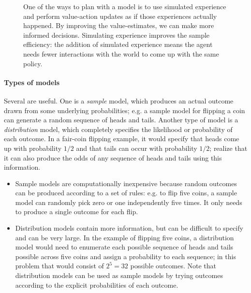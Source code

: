 \documentclass[12pt]{article}
\begin{document}
\begin{figure}[h]
  \centering
  \caption{\footnotesize One of the ways to plan with a model is to use simulated experience and perform value-action updates as if those experiences actually happened. By improving the value-estimates, we can make more informed decisions. Simulating experience improves the sample efficiency: the addition of simulated experience means the agent needs fewer interactions with the world to come up with the same policy.}
\end{figure}

\paragraph{Types of models} Several are useful. One is a \emph{sample} model, which produces an actual outcome drawn from some underlying probabilities; e.g. a sample model for flipping a coin can generate a random sequence of heads and tails. Another type of model is a \emph{distribution} model, which completely specifies the likelihood or probability of each outcome. In a fair-coin flipping example, it would specify that heads come up with probability $1/2$ and that tails can occur with probability $1/2$; realize that it can also produce the odds of any sequence of heads and tails using this information.

\begin{itemize}
  \item Sample models are computationally inexpensive because random outcomes can be produced according to a set of rules: e.g. to flip five coins, a sample model can randomly pick zero or one independently five times. It only needs to produce a single outcome for each flip.
\item Distribution models contain more information, but can be difficult to specify and can be very large. In the example of flipping five coins, a distribution model would need to enumerate each possible sequence of heads and tails possible across five coins and assign a probability to each sequence; in this problem that would consist of $2^5 = 32$ possible outcomes. Note that distribution models can be used as sample models by trying outcomes according to the explicit probabilities of each outcome.
\end{itemize}
\end{document}
